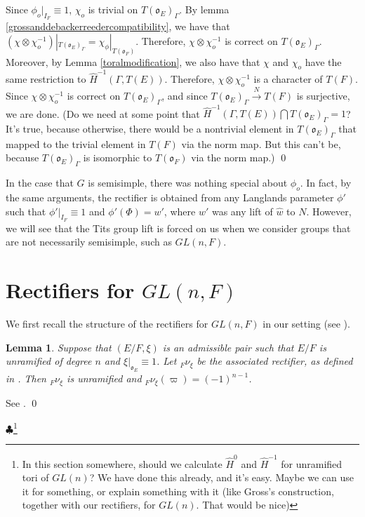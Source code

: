 \documentclass[11pt]{amsart}
\theoremstyle{plain}
\newtheorem{lemma}[enumi]{Lemma}
\newcommand{\MAxxx}[1]{$\clubsuit$\footnote{#1}}
\begin{document}
Since $\phi_o|_{I_F} \equiv 1$, $\chi_o$ is trivial on $T(\mathfrak{o}_E)_{\Gamma}$.  By lemma \ref{grossanddebackerreedercompatibility}, we have that $(\chi \otimes \chi_o^{-1})|_{T(\mathfrak{o}_E)_{\Gamma}} = \chi_{\phi}|_{T(\mathfrak{o}_F)}$.  Therefore, $\chi \otimes \chi_o^{-1}$ is correct on $T(\mathfrak{o}_E)_{\Gamma}$.  Moreover, by Lemma \ref{toralmodification}, we also have that $\chi$ and $\chi_o$ have the same restriction to $\hat{H}^{-1}(\Gamma, T(E))$.  Therefore, $\chi \otimes \chi_o^{-1}$ is a character of $T(F)$.  Since $\chi \otimes \chi_o^{-1}$ is correct on $T(\mathfrak{o}_E)_{\Gamma}$, and since $T(\mathfrak{o}_E)_{\Gamma} \xrightarrow{N} T(F)$ is surjective, we are done.  (Do we need at some point that $\hat{H}^{-1}(\Gamma, T(E)) \bigcap T(\mathfrak{o}_E)_{\Gamma} = 1$?  It's true, because otherwise, there would be a nontrivial element in $T(\mathfrak{o}_E)_{\Gamma}$ that mapped to the trivial element in $T(F)$ via the norm map.  But this can't be, because $T(\mathfrak{o}_E)_{\Gamma}$ is isomorphic to $T(\mathfrak{o}_F)$ via the norm map.)
\qed

In the case that $G$ is semisimple, there was nothing special about $\phi_o$.  In fact, by the same arguments, the rectifier is obtained from any Langlands parameter $\phi'$ such that $\phi'|_{I_F} \equiv 1$ and $\phi'(\Phi) = w'$, where $w'$ was any lift of $\hat{w}$ to $N$.  However, we will see that the Tits group lift is forced on us when we consider groups that are not necessarily semisimple, such as $GL(n,F)$.

\section{Rectifiers for $GL(n,F)$}\label{GL(n)}

We first recall the structure of the rectifiers for $GL(n,F)$ in our setting (see \cite{bushnellhenniart}).

\begin{lemma}
Suppose that $(E/F, \xi)$ is an admissible pair such that $E/F$ is unramified of degree $n$ and $\xi|_{\mathfrak{o}_E} \equiv 1$.  Let ${}_F \nu_{\xi}$ be the associated rectifier, as defined in \cite{bushnellhenniart}.  Then ${}_F \nu_{\xi}$ is unramified and ${}_F \nu_{\xi}(\varpi) = (-1)^{n-1}$.
\end{lemma}

\proof
See \cite[Proposition 21]{bushnellhenniart}.
\qed

\MAxxx{In this section somewhere, should we calculate $\hat{H}^0$ and $\hat{H}^{-1}$ for unramified tori of $GL(n)$? We have done this already, and it's easy.  Maybe we can use it for something, or explain something with it (like Gross's construction, together with our rectifiers, for $GL(n)$.  That would be nice)}
\end{document}
